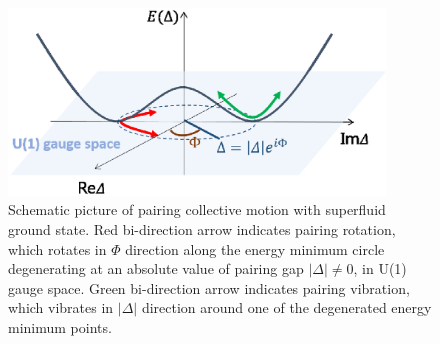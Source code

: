 \documentclass[11pt]{book} %
\begin{document}
\begin{figure}[bt]
 \begin{center}
    \includegraphics[width=100mm]{images/pair_coll.eps}
 \end{center}
  \caption{Schematic picture of pairing collective motion with superfluid ground state. Red  bi-direction arrow indicates pairing rotation, which rotates in $\Phi$ direction along the energy minimum circle degenerating at an absolute value of pairing gap $|\Delta|\neq 0$, in U(1) gauge space. Green bi-direction arrow indicates pairing vibration, which vibrates in $|\Delta|$ direction around one of the degenerated energy minimum points.}
  \label{Pair_coll}
\end{figure}
\end{document}
